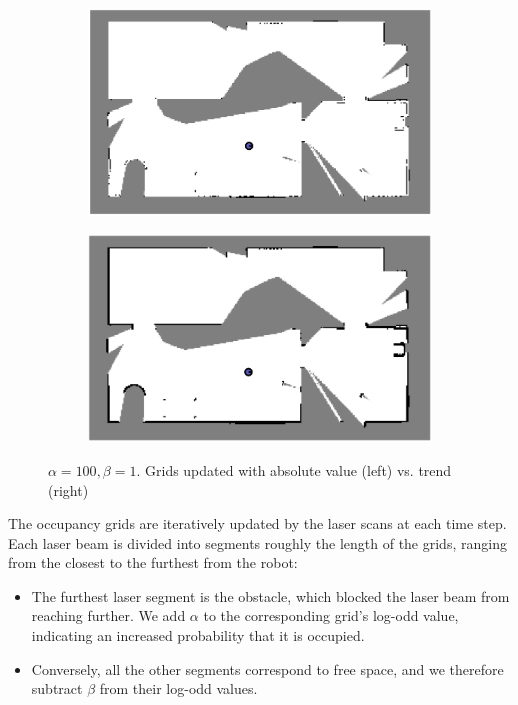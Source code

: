 \documentclass{article} %
\begin{document}
\begin{figure}[hbt]
  \centering
  \begin{subfigure}[b]{0.49\textwidth}
    \centering
    \includegraphics[width=\textwidth]{ass2_q1_a100b1.png}
  \end{subfigure}
  \hfill
  \begin{subfigure}[b]{0.49\textwidth}
    \centering
    \includegraphics[width=\textwidth]{ass2_q1_a100b1_post.png}
  \end{subfigure}
\caption{$\alpha = 100, \beta = 1$. Grids updated with absolute value (left) vs. trend (right)}
\label{fig:q1_a100}
\end{figure}

The occupancy grids are iteratively updated by the laser scans at each time step. Each laser beam is divided into segments roughly the length of the grids, ranging from the closest to the furthest from the robot:
\begin{itemize}
  \item The furthest laser segment is the obstacle, which blocked the laser beam from reaching further. We add $\alpha$ to the corresponding grid's log-odd value, indicating an increased probability that it is occupied.
  \item Conversely, all the other segments correspond to free space, and we therefore subtract $\beta$ from their log-odd values.
\end{itemize}
\end{document}
